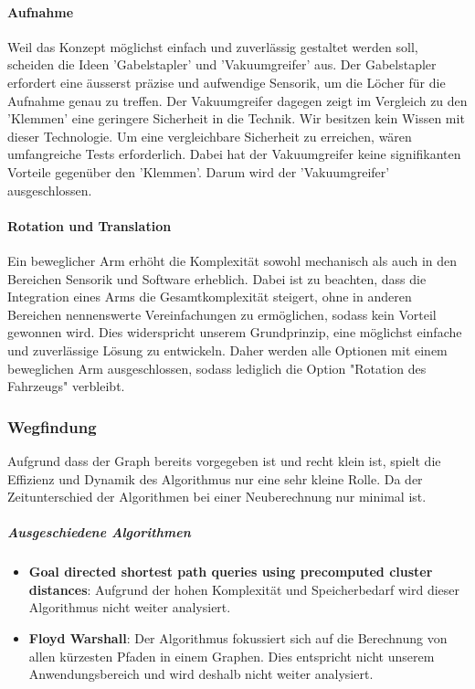 \documentclass[../main.tex]{subfiles}
\begin{document}
        \paragraph{Aufnahme}
        Weil das Konzept möglichst einfach und zuverlässig gestaltet werden soll, scheiden die Ideen 'Gabelstapler' und 'Vakuumgreifer' aus. Der Gabelstapler erfordert eine äusserst präzise und aufwendige Sensorik, um die Löcher für die Aufnahme genau zu treffen. Der Vakuumgreifer dagegen zeigt im Vergleich zu den 'Klemmen' eine geringere Sicherheit in die Technik. Wir besitzen kein Wissen mit dieser Technologie. Um eine vergleichbare Sicherheit zu erreichen, wären umfangreiche Tests erforderlich. Dabei hat der Vakuumgreifer  keine signifikanten Vorteile gegenüber den 'Klemmen'. Darum wird der 'Vakuumgreifer' ausgeschlossen.
        
        \paragraph{Rotation und Translation}
        Ein beweglicher Arm erhöht die Komplexität sowohl mechanisch als auch in den Bereichen Sensorik und Software erheblich. Dabei ist zu beachten, dass die Integration eines Arms die Gesamtkomplexität steigert, ohne in anderen Bereichen nennenswerte Vereinfachungen zu ermöglichen, sodass kein Vorteil gewonnen wird. Dies widerspricht unserem Grundprinzip, eine möglichst einfache und zuverlässige Lösung zu entwickeln. Daher werden alle Optionen mit einem beweglichen Arm ausgeschlossen, sodass lediglich die Option "Rotation des Fahrzeugs" verbleibt.


\newpage
\subsubsection{Wegfindung}

Aufgrund dass der Graph bereits vorgegeben ist und recht klein ist, spielt die Effizienz und Dynamik des Algorithmus nur eine sehr kleine Rolle. Da der Zeitunterschied der Algorithmen bei einer Neuberechnung nur minimal ist.

\subparagraph{Ausgeschiedene Algorithmen}

\begin{itemize}
    \item \textbf{Goal directed shortest path queries using precomputed cluster distances}: Aufgrund der hohen Komplexität und Speicherbedarf wird dieser Algorithmus nicht weiter analysiert.
    \item \textbf{Floyd Warshall}: Der Algorithmus fokussiert sich auf die Berechnung von allen kürzesten Pfaden in einem Graphen. Dies entspricht nicht unserem Anwendungsbereich und wird deshalb nicht weiter analysiert.
\end{itemize}
\end{document}
